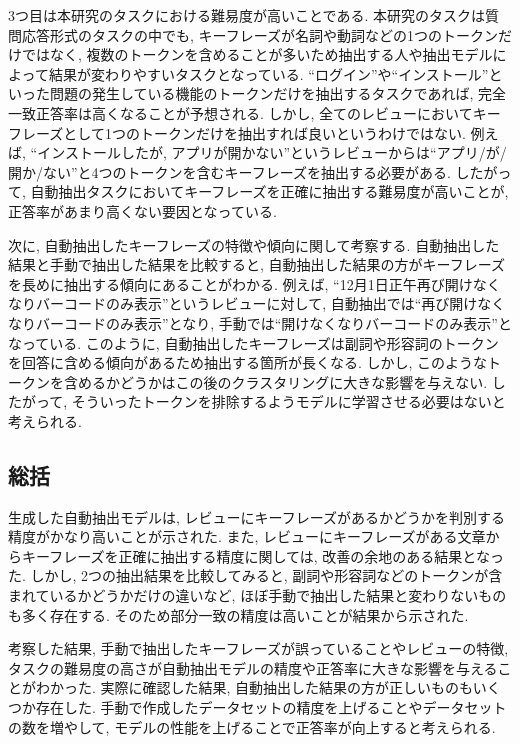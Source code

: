 3つ目は本研究のタスクにおける難易度が高いことである. 本研究のタスクは質問応答形式のタスクの中でも, キーフレーズが名詞や動詞などの1つのトークンだけではなく, 複数のトークンを含めることが多いため抽出する人や抽出モデルによって結果が変わりやすいタスクとなっている. 
``ログイン''や``インストール''といった問題の発生している機能のトークンだけを抽出するタスクであれば, 完全一致正答率は高くなることが予想される. しかし, 全てのレビューにおいてキーフレーズとして1つのトークンだけを抽出すれば良いというわけではない. 
例えば, ``インストールしたが, アプリが開かない''というレビューからは``アプリ/が/開か/ない''と4つのトークンを含むキーフレーズを抽出する必要がある. 
したがって, 自動抽出タスクにおいてキーフレーズを正確に抽出する難易度が高いことが, 正答率があまり高くない要因となっている. 

次に, 自動抽出したキーフレーズの特徴や傾向に関して考察する. 
自動抽出した結果と手動で抽出した結果を比較すると, 自動抽出した結果の方がキーフレーズを長めに抽出する傾向にあることがわかる. 
例えば, ``12月1日正午再び開けなくなりバーコードのみ表示''というレビューに対して, 自動抽出では``再び開けなくなりバーコードのみ表示''となり, 手動では``開けなくなりバーコードのみ表示''となっている. 
このように, 自動抽出したキーフレーズは副詞や形容詞のトークンを回答に含める傾向があるため抽出する箇所が長くなる. しかし, このようなトークンを含めるかどうかはこの後のクラスタリングに大きな影響を与えない. したがって, そういったトークンを排除するようモデルに学習させる必要はないと考えられる. 


\subsection{総括}
生成した自動抽出モデルは, レビューにキーフレーズがあるかどうかを判別する精度がかなり高いことが示された. 
また, レビューにキーフレーズがある文章からキーフレーズを正確に抽出する精度に関しては, 改善の余地のある結果となった. しかし, 2つの抽出結果を比較してみると, 副詞や形容詞などのトークンが含まれているかどうかだけの違いなど, ほぼ手動で抽出した結果と変わりないものも多く存在する. そのため部分一致の精度は高いことが結果から示された. 

考察した結果, 手動で抽出したキーフレーズが誤っていることやレビューの特徴, タスクの難易度の高さが自動抽出モデルの精度や正答率に大きな影響を与えることがわかった. 実際に確認した結果, 自動抽出した結果の方が正しいものもいくつか存在した. 
手動で作成したデータセットの精度を上げることやデータセットの数を増やして, モデルの性能を上げることで正答率が向上すると考えられる. 


